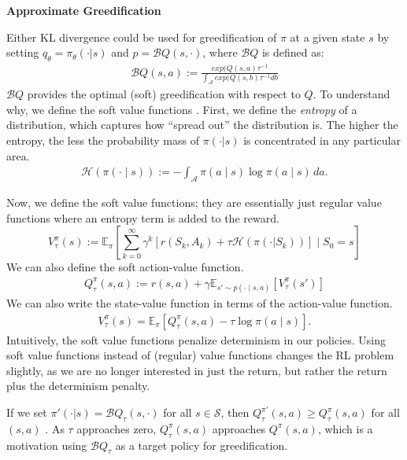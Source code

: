 \documentclass[twoside,11pt]{article}
\newcommand{\Ex}{\mathbb{E}}
\newcommand{\statespace}{\mathcal{S}}
\newcommand{\actionspace}{\mathcal{A}}
\newcommand{\Qhat}{{Q}}
\newcommand{\policyparams}{\theta}
\newcommand{\boltzmannQ}{\mathcal{B}Q}
\newcommand{\entropy}{\mathcal{H}}
\newcommand{\defeq}{:=}
\begin{document}
\textbf{Approximate Greedification}

Either KL divergence could be used for greedification of $\pi$ at a given state $s$ by setting $q_\theta = \pi_\policyparams(\cdot | s)$ and $p =  \boltzmannQ(s, \cdot)$, where $\boltzmannQ$ is defined as:
\begin{align}
\boltzmannQ(s, a) \defeq \frac{exp(Q(s,a)\tau^{-1}}{\int_\actionspace exp(Q(s,b)\tau^{-1} db}
\end{align}
%
$\boltzmannQ$ provides the optimal (soft) greedification with respect to $\Qhat$. To understand why, we define the soft value functions \citep{ziebart2010modeling}. First, we define the \textit{entropy} of a distribution, which captures how ``spread out'' the distribution is. The higher the entropy, the less the probability mass of $\pi(\cdot|s)$ is concentrated in any particular area.
\begin{align*}
    \entropy(\pi(\cdot \mid s)) := - \int_\actionspace \pi(a \mid s) \log \pi(a \mid s)\, da.
\end{align*}

Now, we define the soft value functions; they are essentially just regular value functions where an entropy term is added to the reward. 
\begin{equation*}
    V^{\pi}_\tau(s) \defeq  \Ex_\pi\left[ \sum_{k = 0}^\infty \gamma^k \left[ r(S_k, A_k) + \tau \entropy(\pi(\cdot|S_k))\right] \mid S_0 = s \right] 
\end{equation*}
We can also define the soft action-value function. 
\begin{align*}
    Q^{\pi}_\tau(s,a) \defeq  r(s, a) + \gamma \Ex_{s' \sim p(\cdot \mid s, a)}[V^\pi_\tau(s')]
\end{align*}
We can also write the state-value function in terms of the action-value function.
\begin{align*}
    V^\pi_\tau(s) = \Ex_\pi[Q^\pi_\tau(s, a) - \tau \log \pi(a \mid s)].
\end{align*}
Intuitively, the soft value functions penalize determinism in our policies. Using soft value functions instead of (regular) value functions changes the RL problem slightly, as we are no longer interested in just the return, but rather the return plus the determinism penalty. 

If we set $\pi'(\cdot | s) = \boltzmannQ_\tau(s, \cdot)$ for all $s \in \statespace$, then $Q^{\pi'}_\tau(s,a) \ge Q^{\pi}_\tau(s,a)$ for all $(s,a)$ \citep[Theorem 4]{haarnoja2017reinforcement}. As $\tau$ approaches zero, $Q^{\pi}_\tau(s,a)$ approaches $Q^{\pi}(s,a)$, which is a motivation using $\boltzmannQ_\tau$ as a target policy for greedification.
\end{document}
